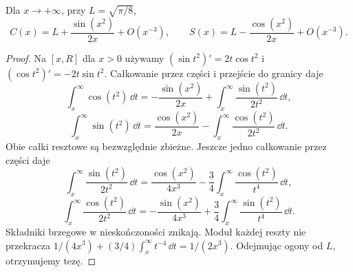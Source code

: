 \begin{wniosek}
\label{ma1:cor:fresnel-tail}
Dla $x\to+\infty$, przy $L=\sqrt{\pi/8}$,
\[
 C(x)=L+\frac{\sin(x^2)}{2x}+O(x^{-3}),\qquad
 S(x)=L-\frac{\cos(x^2)}{2x}+O(x^{-3}).
\]
\end{wniosek}
\begin{proof}
Na $[x,R]$ dla $x>0$ używamy $(\sin t^2)'=2t\cos t^2$ i $(\cos t^2)'=-2t\sin t^2$. Całkowanie przez części i przejście do granicy daje
\[
 \int_x^\infty\cos(t^2)\,\dd t=-\frac{\sin(x^2)}{2x}+\int_x^\infty\frac{\sin(t^2)}{2t^2}\,\dd t,
\]
\[
 \int_x^\infty\sin(t^2)\,\dd t=\frac{\cos(x^2)}{2x}-\int_x^\infty\frac{\cos(t^2)}{2t^2}\,\dd t.
\]
Obie całki resztowe są bezwzględnie zbieżne. Jeszcze jedno całkowanie przez części daje
\[
 \int_x^\infty\frac{\sin(t^2)}{2t^2}\,\dd t
 =\frac{\cos(x^2)}{4x^3}
 -\frac34\int_x^\infty\frac{\cos(t^2)}{t^4}\,\dd t,
\]
\[
 \int_x^\infty\frac{\cos(t^2)}{2t^2}\,\dd t
 =-\frac{\sin(x^2)}{4x^3}
 +\frac34\int_x^\infty\frac{\sin(t^2)}{t^4}\,\dd t.
\]
Składniki brzegowe w nieskończoności znikają. Moduł każdej reszty nie przekracza $1/(4x^3)+(3/4)\int_x^\infty t^{-4}\,\dd t=1/(2x^3)$. Odejmując ogony od $L$, otrzymujemy tezę.
\end{proof}

